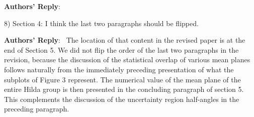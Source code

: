 \documentclass[11pt]{article}
\newenvironment{reply}
   {\medskip \noindent \begin{sf}\textbf{Authors' Reply}:\  }
   {\medskip \end{sf}\medskip}
\newcommand{\edit}[1]{{\color{red}#1}}
\begin{document}
\begin{reply}
\end{reply}

8) Section 4: I think the last two paragraphs should be flipped.

\begin{reply}
The location of that content in the revised paper is at the end of Section 5.
We did not flip the order of the last two paragraphs in the revision, because the discussion of the statistical overlap of various mean planes follows naturally from the immediately preceding presentation of what the subplots of Figure 3 represent.
The numerical value of the mean plane of the entire Hilda group is then presented in the concluding paragraph of section 5.
This complements the discussion of the uncertainty region half-angles in the preceding paragraph.
\end{reply}
\end{document}
